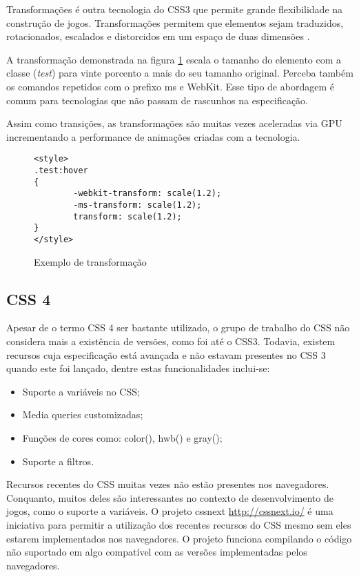 Transformações é outra tecnologia do CSS3 que permite grande
flexibilidade na construção de jogos. Transformações permitem que
elementos sejam traduzidos, rotacionados, escalados e distorcidos em um
espaço de duas dimensões \autocite{html5mostwanted}.

A transformação demonstrada na figura \ref{fig:CSSTransform} escala o
tamanho do elemento com a classe (\textit{test}) para vinte porcento a
mais do seu tamanho original. Perceba também os comandos repetidos com
o prefixo ms e WebKit. Esse tipo de abordagem é comum para tecnologias
que não passam de rascunhos na especificação.

Assim como transições, as transformações são muitas vezes aceleradas
via GPU incrementando a performance de animações criadas com a tecnologia.

\begin{figure}[H]
\centering
\begin{verbatim}
<style>
.test:hover
{
        -webkit-transform: scale(1.2);
        -ms-transform: scale(1.2);
        transform: scale(1.2);
}
</style>
\end{verbatim}
\caption{Exemplo de transformação}
\label{fig:CSSTransform}
\end{figure}

\subsection{CSS 4}

Apesar de o termo CSS 4 ser bastante utilizado, o grupo de trabalho do CSS
não considera mais a existência de versões, como foi até o CSS3.
Todavia, existem recursos cuja especificação está avançada e não estavam presentes
no CSS 3 quando este foi lançado, dentre estas funcionalidades inclui-se:

\begin{itemize}
\item Suporte a variáveis no CSS;
\item Media queries customizadas;
\item Funções de cores como: color(), hwb() e gray();
\item Suporte a filtros.
\end{itemize}

Recursos recentes do CSS muitas vezes não estão presentes nos
navegadores. Conquanto, muitos deles são interessantes no contexto de
desenvolvimento de jogos, como o suporte a variáveis. O projeto cssnext
\url{http://cssnext.io/} é uma iniciativa para permitir a utilização
dos recentes recursos do CSS mesmo sem eles estarem implementados nos
navegadores. O projeto funciona compilando o código não suportado em
algo compatível com as versões implementadas pelos navegadores.

